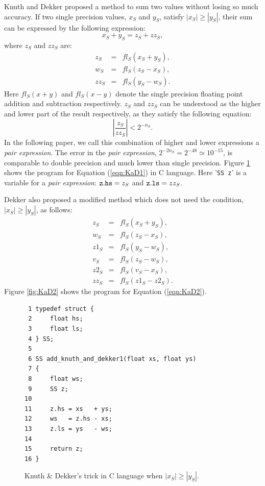 Knuth \cite{Knuth} and Dekker \cite{Dekker}
proposed a method to sum two values without
losing so much accuracy. If two single precision values, 
$x_S$ and $y_S$, satisfy $|x_S|\geq |y_S|$, their sum 
can be expressed by the following expression:
\begin{equation}
x_S + y_S = z_S + zz_S,
\end{equation}
where $z_S$ and $zz_S$ are:
\begin{eqnarray}
z_S &=& fl_S(x_S + y_S),\nonumber \\
w_S &=& fl_S(z_S - x_S),\label{eqn:KaD1}\\
zz_S &=& fl_S( y_S - w_S).\nonumber
\end{eqnarray}
Here $fl_S(x+y)$ and $fl_S(x-y)$ denote the single precision floating point 
addition and subtraction respectively.
$z_S$ and $zz_S$ can be understood as the higher and lower part
of the result respectively, as they satisfy the following equation:
\begin{equation}
|\frac{z_S}{zz_S}|<2^{-n_S}.
\end{equation}
In the following paper, we call this combination of 
higher and lower expressions a {\it pair expression}.
The error in the {\it pair expression}, $2^{-2 n_S}=2^{-48}\simeq 10^{-15}$,
is comparable to double precision and much lower than single precision.
Figure \ref{fig:KaD1} shows the program for Equation (\ref{eqn:KaD1})
in C language. Here '{\tt SS z}' is a variable for a {\it pair 
expression}: ${\tt z.hs}=z_S$ and ${\tt z.ls}=zz_S$.

Dekker also proposed a modified method which does not need the
condition, $|x_S|\geq |y_S|$, as follows:
\begin{eqnarray}
z_S &=& fl_S(x_S + y_S),\nonumber \\
w_S &=& fl_S(z_S - x_S),\nonumber \\
z1_S &=& fl_S(y_S - w_S),\nonumber \\
v_S &=& fl_S(z_S - w_S),\label{eqn:KaD2}\\
z2_S &=& fl_S(v_S - x_S),\nonumber \\
zz_S &=& fl_S(z1_S - z2_S).\nonumber
\end{eqnarray}
Figure \ref{fig:KaD2} shows the program for Equation (\ref{eqn:KaD2}).


\begin{figure}
\begin{center}\footnotesize
\begin{minipage}{100mm}\def\baselinestretch{0.8}
\begin{verbatim}
 1 typedef struct {
 2     float hs;
 3     float ls;
 4 } SS;
 5 
 6 SS add_knuth_and_dekker1(float xs, float ys)
 7 {
 8     float ws;
 9     SS z;
10 
11     z.hs = xs   + ys;
12     ws   = z.hs - xs;
13     z.ls = ys   - ws;
14 
15     return z;
16 }
\end{verbatim}\def\baselinestretch{1.0}
\end{minipage}
\caption{Knuth \& Dekker's trick in C language when $|x_S|\geq |y_S|$.}
\label{fig:KaD1}
\end{center}
\end{figure}

